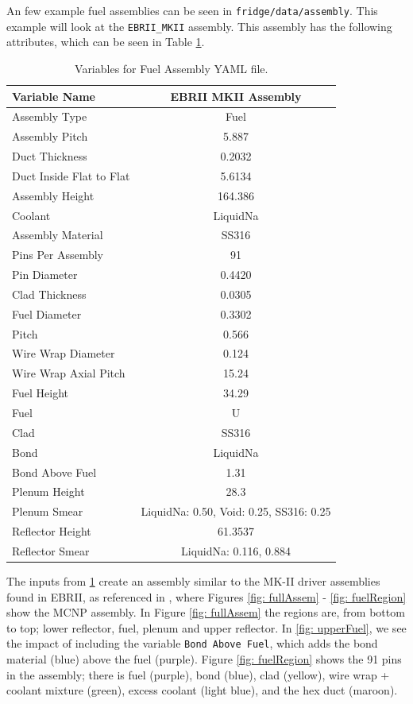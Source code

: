 \documentclass{article}
\begin{document}
An few example fuel assemblies can be seen in \verb|fridge/data/assembly|. This example will look at the \verb|EBRII_MKII| assembly. This assembly has the following attributes, which can be seen in Table \ref{tab:ebrii}.

\begin{table}[H]
	\centering
	\caption{Variables for Fuel Assembly YAML file.}
	\begin{tabular}{lc}\toprule
		Variable Name   & EBRII MKII Assembly
		\\
		\hline
		Assembly Type  & Fuel 
		\\
		Assembly Pitch & 5.887 
		\\		
		Duct Thickness & 0.2032 
		\\
	    Duct Inside Flat to Flat & 5.6134 
		\\
		Assembly Height & 164.386 
		\\
		Coolant & LiquidNa 
		\\
		Assembly Material & SS316
		\\
		Pins Per Assembly & 91 
		\\
		Pin Diameter & 0.4420 
		\\
		Clad Thickness & 0.0305
		\\
		Fuel Diameter & 0.3302
		\\		
		Pitch & 0.566
		\\		
		Wire Wrap Diameter & 0.124
		\\
		Wire Wrap Axial Pitch & 15.24 
		\\
		Fuel Height & 34.29 
		\\
		Fuel & U
		\\
		Clad & SS316 
		\\
		Bond & LiquidNa 
		\\
		Bond Above Fuel & 1.31 
		\\
		Plenum Height & 28.3
		\\
		Plenum Smear & {LiquidNa: 0.50, Void: 0.25, SS316: 0.25} 
		\\
		Reflector Height & 61.3537 
		\\
		Reflector Smear & {LiquidNa: 0.116, 0.884} 
		\\
		\bottomrule
	\end{tabular}
	\label{tab:ebrii}
\end{table}

The inputs from \ref{tab:ebrii} create an assembly similar to the MK-II driver assemblies found in EBRII, as referenced in \cite{ebrii}, where Figures \ref{fig: fullAssem} - \ref{fig: fuelRegion} show the MCNP assembly. In Figure \ref{fig: fullAssem} the regions are, from bottom to top; lower reflector, fuel, plenum and upper reflector. In \ref{fig: upperFuel}, we see the impact of including the variable \verb|Bond Above Fuel|, which adds the bond material (blue) above the fuel (purple). Figure \ref{fig: fuelRegion} shows the 91 pins in the assembly; there is fuel (purple), bond (blue), clad (yellow), wire wrap + coolant mixture (green), excess coolant (light blue), and the hex duct (maroon).
\end{document}
